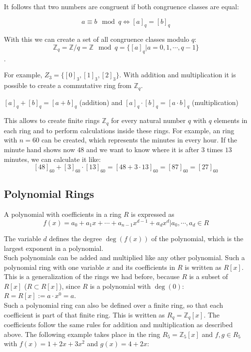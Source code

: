 It follows that two numbers are congruent if both congruence classes are equal:

$$a \equiv b \mod q \Leftrightarrow [a]_q = [b]_q$$

With this we can create a set of all congruence classes modulo $q$:
$$\mathbb{Z}_q = \mathbb{Z}/q = \mathbb{Z} \mod q = \{[a]_q | a = 0, 1, \cdots, q-1 \}$$.

For example, $Z_3 = \{[0]_3, [1]_3, [2]_3\}$. With addition and multiplication it is possible to create a commutative ring from $\mathbb{Z}_q$.
\begin{center}
  $[a]_q + [b]_q = [a+b]_q$ (addition) and $[a]_q \cdot [b]_q = [a\cdot b]_q$ (multiplication)
\end{center}

This allows to create finite rings $\mathbb{Z}_q$ for every natural number $q$ with $q$ elements in each ring and to perform calculations inside these rings. For example, an ring with $n=60$ can be created, which represents the minutes in every hour. If the minute hand shows now $48$ and we want to know where it is after $3$ times $13$ minutes, we can calculate it like:
$$[48]_{60} + [3]_{60}\cdot [13]_{60} = [48+3\cdot 13]_{60} = [87]_{60} = [27]_{60}$$

\subsection*{Polynomial Rings}

A polynomial with coefficients in a ring $R$ is expressed as 
$$f(x) = a_0+ a_1x+\cdots+ a_{n-1}x^{d-1}+a_dx^d | a_0, \cdots, a_d \in R$$

The variable $d$ defines the degree $\deg(f(x))$ of the polynomial, which is the largest exponent in a polynomial.\\
Such polynomials can be added and multiplied like any other polynomial. Such a polynomial ring with one variable $x$ and its coefficients in $R$ is written as $R[x]$. This is a generalization of the rings we had before, because $R$ is a subset of $R[x]$ ($R \subset R[x]$), since $R$ is a polynomial with $\deg(0)$: $R = R[x] := a\cdot x^0 = a$.\\
Such a polynomial ring can also be defined over a finite ring, so that each coefficient is part of that finite ring. This is written as $R_q = \mathbb{Z}_q[x]$. The coefficients follow the same rules for addition and multiplication as described above. The following example takes place in the ring $R_5 = \mathbb{Z}_5[x]$ and $f, g \in R_5$ with $f(x)=1+2x+3x^2$ and $g(x)=4+2x$:

